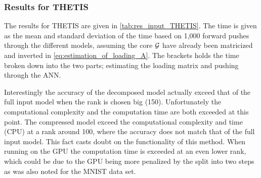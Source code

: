 \subsubsection{Results for THETIS}
The results for THETIS are given in \autoref{tab:res_input_THETIS}. The time is given as the mean and standard deviation of the time based on 1,000 forward pushes through the different models, assuming the core $\mathcal{G}$ have already been matricized and inverted in \eqref{eq:estimation_of_loading_A}. The brackets holds the time broken down into the two parts; estimating the loading matrix and pushing through the ANN.

Interestingly the accuracy of the decomposed model actually exceed that of the full input model when the rank is chosen big (150). Unfortunately the computational complexity and the computation time are both exceeded at this point. The compressed model exceed the computational complexity and time (CPU) at a rank around 100, where the accuracy does not match that of the full input model. This fact casts doubt on the functionality of this method. When running on the GPU the computation time is exceeded at an even lower rank, which could be due to the GPU being more penalized by the split into two steps as was also noted for the MNIST data set. 

